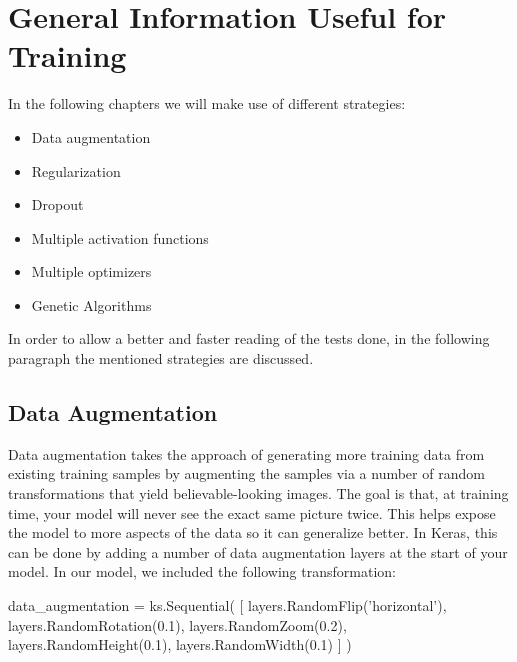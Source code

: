 \section{General Information Useful for Training}
In the following chapters we will make use of different strategies:
\begin{itemize}
\item Data augmentation
\item Regularization
\item Dropout
\item Multiple activation functions
\item Multiple optimizers
\item Genetic Algorithms
\end{itemize}
In order to allow a better and faster reading of the tests done, in the following paragraph the mentioned strategies are discussed.

\subsection{Data Augmentation}
Data augmentation takes the approach of generating more training data from existing training samples by augmenting the samples via a number of random transformations that yield believable-looking images. The goal is that, at training time, your model will never see the exact same picture twice. This helps expose the model to more aspects of the data so it can generalize better.
In Keras, this can be done by adding a number of data augmentation layers at the start of your model. In our model, we included the following transformation:

\begin{python}
data_augmentation = ks.Sequential(
    [
        layers.RandomFlip('horizontal'),
        layers.RandomRotation(0.1),
        layers.RandomZoom(0.2),
        layers.RandomHeight(0.1),
        layers.RandomWidth(0.1)
    ]
)
\end{python}


